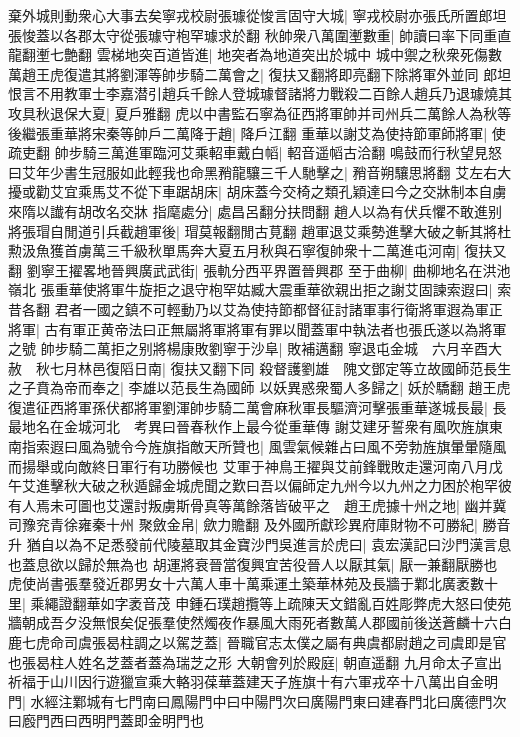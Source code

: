 棄外城則動衆心大事去矣寧戎校尉張璩從悛言固守大城|{
	寧戎校尉亦張氏所置郎坦張悛蓋以各郡太守從張璩守枹罕璩求於翻}
秋帥衆八萬圍壍數重|{
	帥讀曰率下同重直龍翻壍七艶翻}
雲梯地突百道皆進|{
	地突者為地道突出於城中}
城中禦之秋衆死傷數萬趙王虎復遣其將劉渾等帥步騎二萬會之|{
	復扶又翻將即亮翻下除將軍外並同}
郎坦恨言不用教軍士李嘉潜引趙兵千餘人登城璩督諸將力戰殺二百餘人趙兵乃退璩燒其攻具秋退保大夏|{
	夏戶雅翻}
虎以中書監石寧為征西將軍帥并司州兵二萬餘人為秋等後繼張重華將宋秦等帥戶二萬降于趙|{
	降戶江翻}
重華以謝艾為使持節軍師將軍|{
	使疏吏翻}
帥步騎三萬進軍臨河艾乘軺車戴白幍|{
	軺音遥幍古洽翻}
鳴鼓而行秋望見怒曰艾年少書生冠服如此輕我也命黑矟龍驤三千人馳擊之|{
	矟音朔驤思將翻}
艾左右大擾或勸艾宜乘馬艾不從下車踞胡床|{
	胡床蓋今交椅之類孔穎達曰今之交牀制本自虜來隋以䜟有胡改名交牀}
指麾處分|{
	處昌呂翻分扶問翻}
趙人以為有伏兵懼不敢進别將張瑁自閒道引兵截趙軍後|{
	瑁莫報翻閒古莧翻}
趙軍退艾乘勢進擊大破之斬其將杜勲汲魚獲首虜萬三千級秋單馬奔大夏五月秋與石寧復帥衆十二萬進屯河南|{
	復扶又翻}
劉寧王擢畧地晉興廣武武街|{
	張軌分西平界置晉興郡}
至于曲柳|{
	曲柳地名在洪池嶺北}
張重華使將軍牛旋拒之退守枹罕姑臧大震重華欲親出拒之謝艾固諫索遐曰|{
	索昔各翻}
君者一國之鎮不可輕動乃以艾為使持節都督征討諸軍事行衛將軍遐為軍正將軍|{
	古有軍正黄帝法曰正無屬將軍將軍有罪以聞蓋軍中執法者也張氏遂以為將軍之號}
帥步騎二萬拒之别將楊康敗劉寧于沙阜|{
	敗補邁翻}
寧退屯金城　六月辛酉大赦　秋七月林邑復䧟日南|{
	復扶又翻下同}
殺督護劉雄　隗文鄧定等立故國師范長生之子賁為帝而奉之|{
	李雄以范長生為國師}
以妖異惑衆蜀人多歸之|{
	妖於驕翻}
趙王虎復遣征西將軍孫伏都將軍劉渾帥步騎二萬會麻秋軍長驅濟河擊張重華遂城長最|{
	長最地名在金城河北　考異曰晉春秋作上最今從重華傳}
謝艾建牙誓衆有風吹旌旗東南指索遐曰風為號令今旌旗指敵天所贊也|{
	風雲氣候雜占曰風不旁勃旌旗暈暈隨風而揚舉或向敵終日軍行有功勝候也}
艾軍于神鳥王擢與艾前鋒戰敗走還河南八月戊午艾進擊秋大破之秋遁歸金城虎聞之歎曰吾以偏師定九州今以九州之力困於枹罕彼有人焉未可圖也艾還討叛虜斯骨真等萬餘落皆破平之　趙王虎據十州之地|{
	幽并冀司豫兖青徐雍秦十州}
聚斂金帛|{
	歛力贍翻}
及外國所獻珍異府庫財物不可勝紀|{
	勝音升}
猶自以為不足悉發前代陵墓取其金寶沙門吳進言於虎曰|{
	袁宏漢記曰沙門漢言息也蓋息欲以歸於無為也}
胡運將衰晉當復興宜苦役晉人以厭其氣|{
	厭一兼翻厭勝也}
虎使尚書張羣發近郡男女十六萬人車十萬乘運土築華林苑及長牆于鄴北廣袤數十里|{
	乘繩證翻華如字袤音茂}
申鍾石璞趙攬等上疏陳天文錯亂百姓彫弊虎大怒曰使苑牆朝成吾夕没無恨矣促張羣使然燭夜作暴風大雨死者數萬人郡國前後送蒼麟十六白鹿七虎命司虞張曷柱調之以駕芝蓋|{
	晉職官志太僕之屬有典虞都尉趙之司虞即是官也張曷柱人姓名芝蓋者蓋為瑞芝之形}
大朝會列於殿庭|{
	朝直遥翻}
九月命太子宣出祈福于山川因行遊獵宣乘大輅羽葆華蓋建天子旌旗十有六軍戎卒十八萬出自金明門|{
	水經注鄴城有七門南曰鳳陽門中曰中陽門次曰廣陽門東曰建春門北曰廣德門次曰廏門西曰西明門蓋即金明門也}
